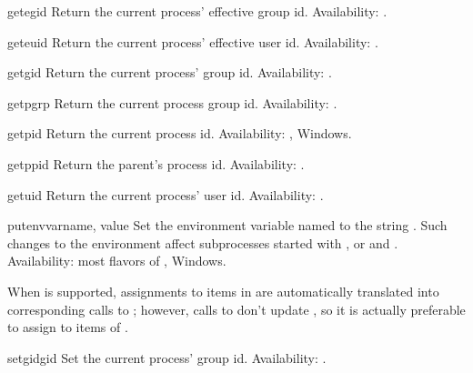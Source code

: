 \begin{funcdesc}{getegid}{}
Return the current process' effective group id.
Availability: \UNIX{}.
\end{funcdesc}

\begin{funcdesc}{geteuid}{}
Return the current process' effective user id.
Availability: \UNIX{}.
\end{funcdesc}

\begin{funcdesc}{getgid}{}
Return the current process' group id.
Availability: \UNIX{}.
\end{funcdesc}

\begin{funcdesc}{getpgrp}{}
Return the current process group id.
Availability: \UNIX{}.
\end{funcdesc}

\begin{funcdesc}{getpid}{}
Return the current process id.
Availability: \UNIX{}, Windows.
\end{funcdesc}

\begin{funcdesc}{getppid}{}
Return the parent's process id.
Availability: \UNIX{}.
\end{funcdesc}

\begin{funcdesc}{getuid}{}
Return the current process' user id.
Availability: \UNIX{}.
\end{funcdesc}

\begin{funcdesc}{putenv}{varname, value}
Set the environment variable named  to the string
.  Such changes to the environment affect subprocesses
started with ,  or
 and .
Availability: most flavors of \UNIX{}, Windows.

When  is
supported, assignments to items in  are automatically
translated into corresponding calls to ; however,
calls to  don't update , so it is
actually preferable to assign to items of .  
\end{funcdesc}

\begin{funcdesc}{setgid}{gid}
Set the current process' group id.
Availability: \UNIX{}.
\end{funcdesc}

